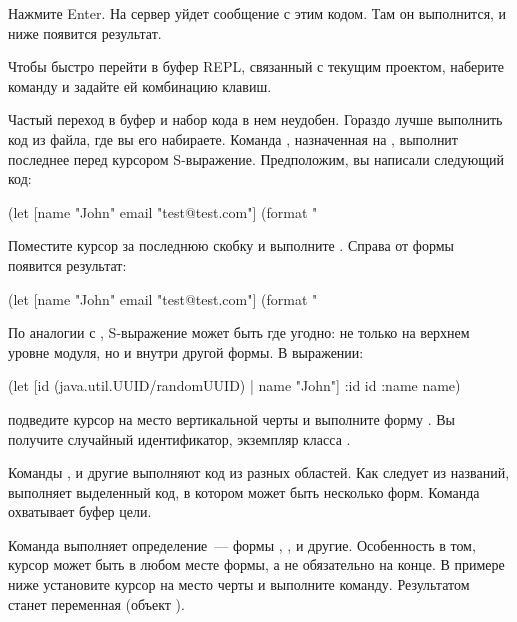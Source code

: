 Нажмите Enter. На сервер уйдет сообщение с этим кодом. Там он выполнится, и ниже появится результат.

Чтобы быстро перейти в буфер REPL, связанный с текущим проектом, наберите команду  и задайте ей комбинацию клавиш.

Частый переход в буфер  и набор кода в нем неудобен. Гораздо лучше выполнить код из файла, где вы его набираете. Команда , назначенная на , выполнит последнее перед курсором S-выражение. Предположим, вы написали следующий код:

\begin{english}
  \begin{clojure}
(let [name "John"
      email "test@test.com"]
  (format "%
  \end{clojure}
\end{english}

Поместите курсор за последнюю скобку и выполните . Справа от формы появится результат:

\begin{english}
  \begin{clojure}
(let [name "John"
      email "test@test.com"]
  (format "%
  \end{clojure}
\end{english}

По аналогии с , S-выражение может быть где угодно: не только на верхнем уровне модуля, но и внутри другой формы. В выражении:

\begin{english}
  \begin{clojure}
(let [id (java.util.UUID/randomUUID) |
      name "John"]
  {:id id
   :name name})
  \end{clojure}
\end{english}

подведите курсор на место вертикальной черты и выполните форму . Вы получите случайный идентификатор, экземпляр класса .

Команды ,  и другие выполняют код из разных областей. Как следует из названий,  выполняет выделенный код, в котором может быть несколько форм. Команда  охватывает буфер цели.

Команда  выполняет определение~--- формы , ,  и другие. Особенность в том, курсор может быть в любом месте формы, а не обязательно на конце. В примере ниже установите курсор на место черты и выполните команду. Результатом станет переменная  (объект ).

